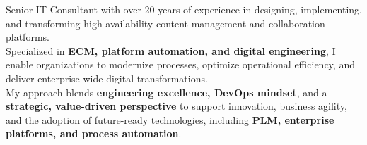 \vspace{0.2em}  %
\par{
    Senior IT Consultant with over 20 years of experience in designing, implementing, and transforming high-availability content management and collaboration platforms.\\
    Specialized in \textbf{ECM, platform automation, and digital engineering}, I enable organizations to modernize processes, optimize operational efficiency, and deliver enterprise-wide digital transformations.\\
    My approach blends \textbf{engineering excellence, DevOps mindset}, and a \textbf{strategic, value-driven perspective} to support innovation, business agility, and the adoption of future-ready technologies, including \textbf{PLM, enterprise platforms, and process automation}.
    }
\vspace{0.5em}  %
